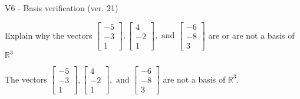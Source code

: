 \begin{exercise}
  \begin{exerciseTitle}V6 - Basis verification (ver. 21)\end{exerciseTitle}
  \begin{exerciseStatement}
    Explain why the vectors \(\left[\begin{array}{r}
-5 \\
-3 \\
1
\end{array}\right] , \left[\begin{array}{r}
4 \\
-2 \\
1
\end{array}\right] , \text{ and } \left[\begin{array}{r}
-6 \\
-8 \\
3
\end{array}\right]\) are or are not a basis of \(\mathbb{R}^3\)	


  \end{exerciseStatement}
  \begin{exerciseAnswer}
   The vectors \(\left[\begin{array}{r}
-5 \\
-3 \\
1
\end{array}\right] , \left[\begin{array}{r}
4 \\
-2 \\
1
\end{array}\right] , \text{ and } \left[\begin{array}{r}
-6 \\
-8 \\
3
\end{array}\right]\) 
  	 are not  a basis of \(\mathbb{R}^3\).
  


  \end{exerciseAnswer}
\end{exercise}
